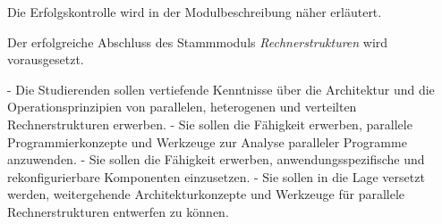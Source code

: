 \begin{course}

\setdoclanguagegerman
{}



\coursehead


\label{cour_7173.dp_997}


\begin{styleenv}
\begin{assessment}
Die Erfolgskontrolle wird in der Modulbeschreibung näher erläutert.


\end{assessment}

\begin{conditions}Der erfolgreiche Abschluss des Stammmoduls \emph{Rechnerstrukturen} wird vorausgesetzt.

\end{conditions}


\end{styleenv}

\begin{learningoutcomes}
- Die Studierenden sollen vertiefende Kenntnisse über die Architektur und die Operationsprinzipien von parallelen, heterogenen und verteilten Rechnerstrukturen erwerben.\newline
- Sie sollen die Fähigkeit erwerben, parallele Programmierkonzepte und Werkzeuge zur Analyse paralleler Programme anzuwenden.\newline
- Sie sollen die Fähigkeit erwerben, anwendungsspezifische und rekonfigurierbare Komponenten einzusetzen.\newline
- Sie sollen in die Lage versetzt werden, weitergehende Architekturkonzepte und Werkzeuge für parallele Rechnerstrukturen entwerfen zu können.


\end{learningoutcomes}


\end{course}
